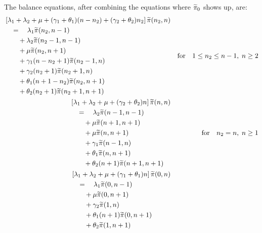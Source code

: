 The balance equations, after combining the equations where $\widetilde{\pi}_0$ shows up, are:
\begin{align}
    \begin{split}
        & \left[ \lambda_1 + \lambda_2 + \mu + (\gamma_1+\theta_1)(n-n_2) + (\gamma_2+\theta_2) n_2 \right] \tpi(n_2,n) \\
        & \quad = \quad \lambda_1 \tpi(n_2,n-1) \\
        & \quad \quad + \lambda_2 \tpi(n_2-1,n-1) \\
        & \quad \quad + \mu \tpi(n_2, n+1) \\
        & \quad \quad + \gamma_1 (n-n_2+1) \tpi(n_2-1, n) \\
        & \quad \quad + \gamma_2 (n_2+1) \tpi(n_2+1,n) \\
        & \quad \quad + \theta_1 (n+1-n_2) \tpi(n_2, n+1) \\
        & \quad \quad + \theta_2 (n_2+1) \tpi(n_2+1, n+1)
    \end{split}
    && \text{for} \quad 1 \leq n_2 \leq n-1, \; n \geq 2 \label{eq:gen:tilde_balance_interior} \\
    \begin{split}
        & \left[ \lambda_1 + \lambda_2 + \mu + (\gamma_2+\theta_2) n \right] \tpi(n,n) \\
        & \quad = \quad \lambda_2 \tpi(n-1,n-1) \\
        & \quad \quad + \mu \tpi(n+1,n+1) \\
        & \quad \quad + \mu \tpi(n,n+1) \\
        & \quad \quad + \gamma_1 \tpi(n-1, n) \\
        & \quad \quad + \theta_1 \tpi(n, n+1) \\
        & \quad \quad + \theta_2 (n+1) \tpi(n+1, n+1)
    \end{split}
    && \text{for} \quad n_2=n, \; n \geq 1 \label{eq:gen:tilde_balance_diagonal} \\
    \begin{split}
        & \left[ \lambda_1 + \lambda_2 + \mu + (\gamma_1+\theta_1) n \right] \tpi(0,n) \\
        & \quad = \quad \lambda_1 \tpi(0,n-1) \\
        & \quad \quad + \mu \tpi(0, n+1) \\
        & \quad \quad + \gamma_2 \tpi(1,n) \\
        & \quad \quad + \theta_1 (n+1) \tpi(0, n+1) \\
        & \quad \quad + \theta_2 \tpi(1, n+1)

\end{split}
\end{align}
